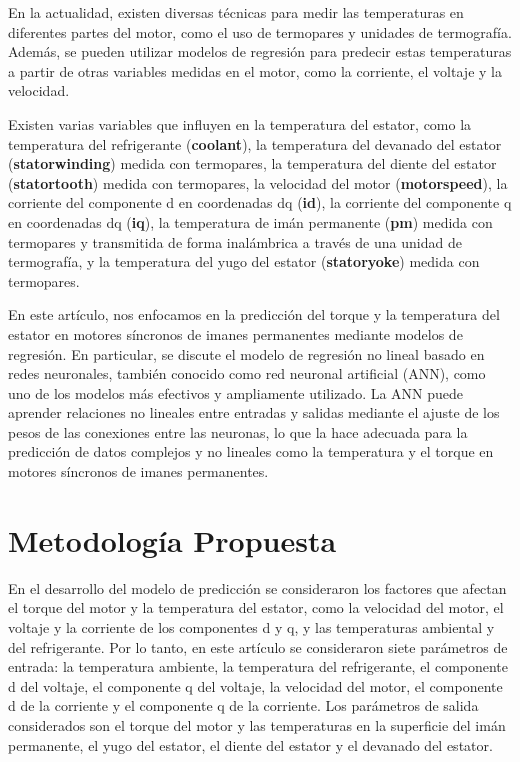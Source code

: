 \documentclass{article}
\begin{document}
En la actualidad, existen diversas técnicas para medir las temperaturas en diferentes partes del motor, como el uso de termopares y unidades de termografía. Además, se pueden utilizar modelos de regresión para predecir estas temperaturas a partir de otras variables medidas en el motor, como la corriente, el voltaje y la velocidad.

Existen varias variables que influyen en la temperatura del estator, como la temperatura del refrigerante (\textbf{coolant}), la temperatura del devanado del estator (\textbf{stator\textunderscore winding}) medida con termopares, la temperatura del diente del estator (\textbf{stator\textunderscore tooth}) medida con termopares, la velocidad del motor (\textbf{motor\textunderscore speed}), la corriente del componente d en coordenadas dq (\textbf{i\textunderscore d}), la corriente del componente q en coordenadas dq (\textbf{i\textunderscore q}), la temperatura de imán permanente (\textbf{pm}) medida con termopares y transmitida de forma inalámbrica a través de una unidad de termografía, y la temperatura del yugo del estator (\textbf{stator\textunderscore yoke}) medida con termopares.


En este artículo, nos enfocamos en la predicción del torque y la temperatura del estator en motores síncronos de imanes permanentes mediante modelos de regresión. En particular, se discute el modelo de regresión no lineal basado en redes neuronales, también conocido como red neuronal artificial (ANN), como uno de los modelos más efectivos y ampliamente utilizado. La ANN puede aprender relaciones no lineales entre entradas y salidas mediante el ajuste de los pesos de las conexiones entre las neuronas, lo que la hace adecuada para la predicción de datos complejos y no lineales como la temperatura y el torque en motores síncronos de imanes permanentes.

\section{Metodología Propuesta}

En el desarrollo del modelo de predicción se consideraron los factores que afectan el torque del motor y la temperatura del estator, como la velocidad del motor, el voltaje y la corriente de los componentes d y q, y las temperaturas ambiental y del refrigerante. Por lo tanto, en este artículo se consideraron siete parámetros de entrada: la temperatura ambiente, la temperatura del refrigerante, el componente d del voltaje, el componente q del voltaje, la velocidad del motor, el componente d de la corriente y el componente q de la corriente. Los parámetros de salida considerados son el torque del motor y las temperaturas en la superficie del imán permanente, el yugo del estator, el diente del estator y el devanado del estator.
\end{document}

